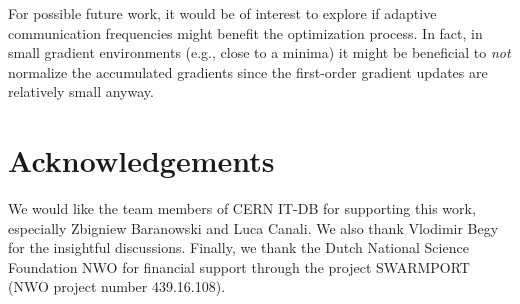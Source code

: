 \documentclass[wcp]{jmlr}
\begin{document}
For possible future work, it would be of interest to explore if adaptive communication frequencies might benefit the optimization process. In fact, in small gradient environments (e.g., close to a minima) it might be beneficial to \emph{not} normalize the accumulated gradients since the first-order gradient updates are relatively small anyway.

\section{Acknowledgements}
\label{sec:acknowledgements}

We would like the team members of CERN IT-DB for supporting this work, especially Zbigniew Baranowski and Luca Canali. We also thank Vlodimir Begy for the insightful discussions. Finally, we thank the Dutch National Science Foundation NWO for financial support through the project SWARMPORT (NWO project number 439.16.108).

\newpage
%


\end{document}

